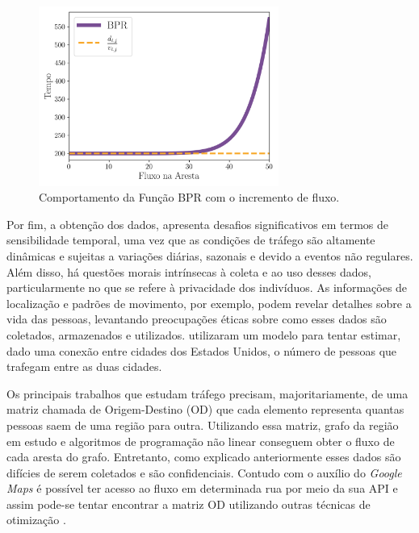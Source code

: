 \documentclass{article}
\begin{document}
\begin{figure}[H]
    \centering
    \includegraphics[width=0.7\textwidth]{img/BPR.png}
    \caption{Comportamento da Função BPR com o incremento de fluxo.}
    \label{fig:BPR}
\end{figure}


Por fim, a obtenção dos dados, apresenta desafios significativos em termos de sensibilidade temporal, uma vez que as condições de tráfego são altamente dinâmicas e sujeitas a variações diárias, sazonais e devido a eventos não regulares. Além disso, há questões morais intrínsecas à coleta e ao uso desses dados, particularmente no que se refere à privacidade dos indivíduos. As informações de localização e padrões de movimento, por exemplo, podem revelar detalhes sobre a vida das pessoas, levantando preocupações éticas sobre como esses dados são coletados, armazenados e utilizados. \citet{Simini2012} utilizaram um modelo para tentar estimar, dado uma conexão entre cidades dos Estados Unidos, o número de pessoas que trafegam entre as duas cidades.

Os principais trabalhos que estudam tráfego precisam, majoritariamente, de uma matriz chamada de Origem-Destino (OD) que cada elemento representa quantas pessoas saem de uma região para outra. Utilizando essa matriz, grafo da região em estudo e algoritmos de programação não linear \cite{LeBlanc1975} conseguem obter o fluxo de cada aresta do grafo. Entretanto, como explicado anteriormente esses dados são difícies de serem coletados e são confidenciais. Contudo com o auxílio do \textit{Google Maps} é possível ter acesso ao fluxo em determinada rua por meio da sua API e assim pode-se tentar encontrar a matriz OD utilizando outras técnicas de otimização \cite{spiess1990gradient,turnquist1979estimation,spiess1987maximum}.
\end{document}
